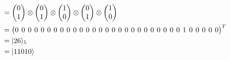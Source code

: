 \documentclass{article}
\begin{document}
\begin{align*}
  &= \begin{pmatrix}0\\1\end{pmatrix}
     \otimes
     \begin{pmatrix}0\\1\end{pmatrix}
     \otimes
     \begin{pmatrix}1\\0\end{pmatrix}
     \otimes
     \begin{pmatrix}0\\1\end{pmatrix}
     \otimes
     \begin{pmatrix}1\\0\end{pmatrix}\\
  &= \begingroup %
     \setlength\arraycolsep{2pt}\setcounter{MaxMatrixCols}{32}
     \begin{pmatrix}0 & 0 & 0 & 0 & 0 & 0 & 0 & 0 & 0 & 0 & 0 & 0 & 0 & 0 & 0 & 0 & 0 & 0 & 0 & 0 & 0 & 0 & 0 & 0 & 0 & 0 & 1 & 0 & 0 & 0 & 0 & 0\end{pmatrix}^{T}
     \endgroup\\
  &= |26\rangle_{5}\\
  &= |11010\rangle
\end{align*}
\end{document}
